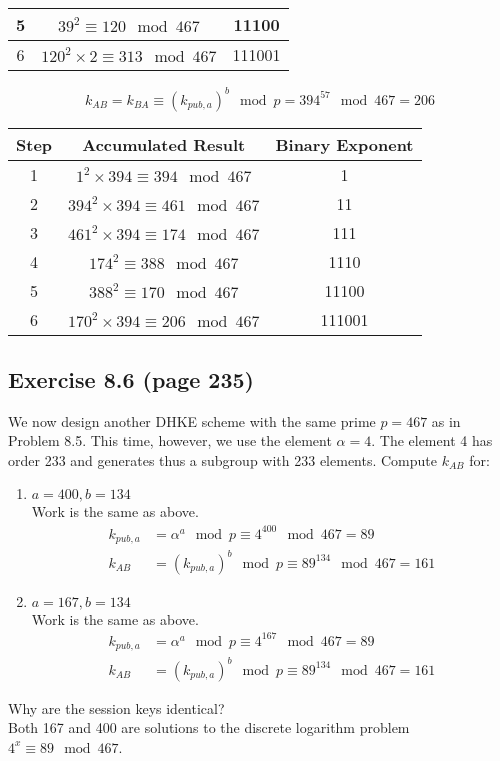 \documentclass{math}
\begin{document}
\begin{enumerate}
\begin{center}
\begin{tabular}{|c|c|c|}
      \hline
      5 & \( 39^2 \equiv 120\mod467 \) & 11100 \\
      \hline
      6 & \( 120^2\times2 \equiv 313\mod467 \) & 111001 \\
      \hline
    \end{tabular}
  \end{center}
  \[ k_{AB} = k_{BA} \equiv (k_{pub,a})^b\mod p = 394^{57}\mod467 = 206 \]
  \begin{center}
    \begin{tabular}{|c|c|c|}
      \hline
      Step & Accumulated Result & Binary Exponent \\
      \hline
      1 & \( 1^2\times394 \equiv 394\mod467 \) & 1 \\
      \hline
      2 & \( 394^2\times394 \equiv 461\mod467 \) & 11 \\
      \hline
      3 & \( 461^2\times394 \equiv 174\mod467 \) & 111 \\
      \hline
      4 & \( 174^2 \equiv 388\mod467 \) & 1110 \\
      \hline
      5 & \( 388^2 \equiv 170\mod467 \) & 11100 \\
      \hline
      6 & \( 170^2\times394 \equiv 206\mod467 \) & 111001 \\
      \hline
    \end{tabular}
  \end{center}
\end{enumerate}

\subsection*{Exercise 8.6 (page 235)}
We now design another DHKE scheme with the same prime \( p = 467 \) as in
Problem 8.5. This time, however, we use the element \( \alpha = 4 \). The
element 4 has order 233 and generates thus a subgroup with 233 elements. Compute
\( k_{AB} \) for:
\begin{enumerate}
  \item \( a = 400, b = 134 \) \\
  Work is the same as above.
  \begin{align*}
    k_{pub,a} &= \alpha^a\mod p \equiv 4^{400}\mod467 = 89 \\
    k_{AB} &= (k_{pub,a})^b\mod p \equiv 89^{134}\mod467 = 161
  \end{align*}
  \item \( a = 167, b = 134 \) \\
  Work is the same as above.
  \begin{align*}
    k_{pub,a} &= \alpha^a\mod p \equiv 4^{167}\mod467 = 89 \\
    k_{AB} &= (k_{pub,a})^b\mod p \equiv 89^{134}\mod467 = 161
  \end{align*}
\end{enumerate}
Why are the session keys identical? \\
Both 167 and 400 are solutions to the discrete logarithm problem
\( 4^x\equiv89\mod467 \).
\end{document}
